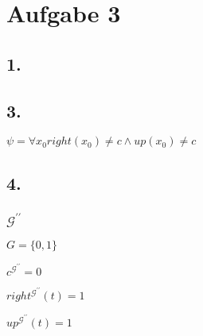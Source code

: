 \section*{Aufgabe 3}

\subsection*{1.}



\subsection*{3.}

$\psi = \forall x_0  right(x_0) \neq c \wedge up(x_0) \neq c$

\subsection*{4.}

\subsubsection*{$\mathcal{G}^{\prime \prime}$}

$G = \{0,1\}$

$c^{\mathcal{G}^{\prime \prime}} = 0$

$right^{\mathcal{G}^{\prime \prime}}(t) = 1$

$up^{\mathcal{G}^{\prime \prime}}(t) = 1$